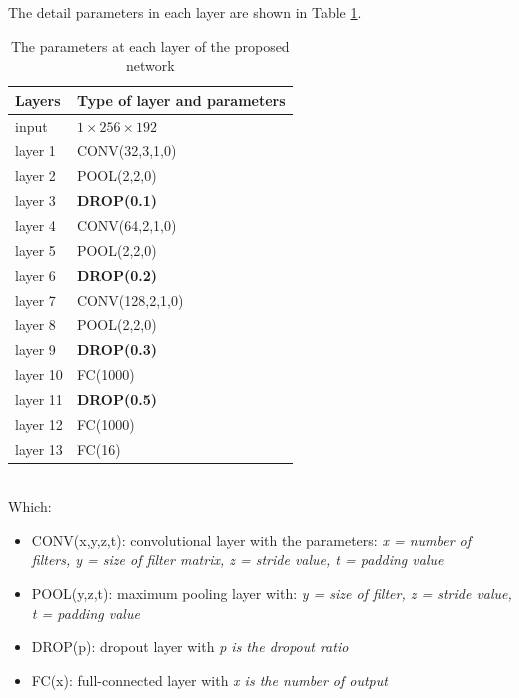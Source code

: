 \documentclass[conference]{IEEEtran}
\begin{document}
The detail parameters in each layer are shown in Table \ref{modelparameters}.
\begin{table}[htbp]
	\caption{The parameters at each layer of the proposed network}
	\centering
	\begin{tabular}{| l |  p{4cm} | }
	\hline
		Layers &  Type of layer and parameters  \\ \hline
		input & $1 \times 256 \times 192$ \\ \hline
 		layer 1 & CONV(32,3,1,0) \\ \hline
		layer 2 & POOL(2,2,0) \\ \hline
		layer 3 & \textbf{DROP(0.1)} \\ \hline
		layer 4 & CONV(64,2,1,0) \\ \hline
		layer 5 & POOL(2,2,0) \\ \hline
		layer 6 & \textbf{DROP(0.2)} \\ \hline
		layer 7 & CONV(128,2,1,0) \\ \hline
		layer 8 & POOL(2,2,0) \\ \hline
		layer 9 & \textbf{DROP(0.3)} \\ \hline
		layer 10 & FC(1000) \\ \hline
		layer 11 & \textbf{DROP(0.5)} \\ \hline
		layer 12& FC(1000) \\ \hline
		layer 13 & FC(16) \\ \hline
	\end{tabular}
	\label{modelparameters}
\end{table}~\\[1cm]
Which:
\begin{itemize}
	\item CONV(x,y,z,t): convolutional layer with the parameters: \textit{x = number of filters, y = size of filter matrix, z = stride value, t = padding value}
	\item POOL(y,z,t): maximum pooling layer with: \textit{y = size of filter, z = stride value, t = padding value}
	\item DROP(p): dropout layer with \textit{p is the dropout ratio}
	\item FC(x): full-connected layer with \textit{x is the number of output}
\end{itemize}
\end{document}
